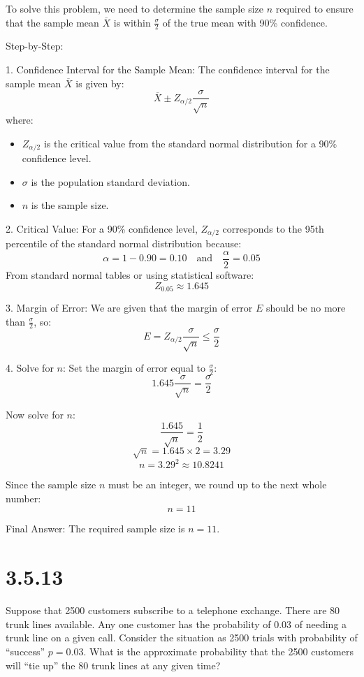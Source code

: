 \documentclass{article}
\begin{document}
To solve this problem, we need to determine the sample size \(n\) required to ensure that the sample mean \(\overline{X}\) is within \(\frac{\sigma}{2}\) of the true mean with 90\% confidence.\newline

Step-by-Step:\newline

1. Confidence Interval for the Sample Mean:
The confidence interval for the sample mean \(\overline{X}\) is given by:
\[
\overline{X} \pm Z_{\alpha/2} \frac{\sigma}{\sqrt{n}}
\]
where:
\begin{itemize}
    \item \(Z_{\alpha/2}\) is the critical value from the standard normal distribution for a 90\% confidence level.
    \item \(\sigma\) is the population standard deviation.
    \item \(n\) is the sample size.
\end{itemize}

2. Critical Value:
For a 90\% confidence level, \(Z_{\alpha/2}\) corresponds to the 95th percentile of the standard normal distribution because:
\[
\alpha = 1 - 0.90 = 0.10 \quad \text{and} \quad \frac{\alpha}{2} = 0.05
\]
From standard normal tables or using statistical software:
\[
Z_{0.05} \approx 1.645
\]

3. Margin of Error:
We are given that the margin of error \(E\) should be no more than \(\frac{\sigma}{2}\), so:
\[
E = Z_{\alpha/2} \frac{\sigma}{\sqrt{n}} \leq \frac{\sigma}{2}
\]

4. Solve for \(n\):
Set the margin of error equal to \(\frac{\sigma}{2}\):
\[
1.645 \frac{\sigma}{\sqrt{n}} = \frac{\sigma}{2}
\]

Now solve for \(n\):
\[
\frac{1.645}{\sqrt{n}} = \frac{1}{2}
\]
\[
\sqrt{n} = 1.645 \times 2 = 3.29
\]
\[
n = 3.29^2 \approx 10.8241
\]

Since the sample size \(n\) must be an integer, we round up to the next whole number:
\[
n = 11
\]

Final Answer:
The required sample size is \(n = 11\).


\section*{3.5.13}

Suppose that 2500 customers subscribe to a telephone exchange. There are 80 trunk lines available. Any one customer has the probability of 0.03 of needing a trunk line on a given call. Consider the situation as 2500 trials with probability of “success” \(p = 0.03\). What is the approximate probability that the 2500 customers will “tie up” the 80 trunk lines at any given time?
\end{document}
